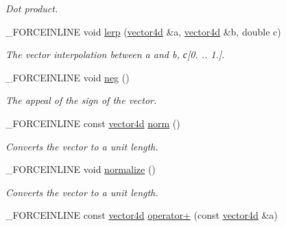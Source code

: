 \begin{DoxyCompactItemize}
\begin{DoxyCompactList}\small\item\em Dot product. \end{DoxyCompactList}\item 
\hypertarget{classbt_1_1vector4d_ab1e3ffe12c06bbbcbb81704040e593ce}{\-\_\-\-F\-O\-R\-C\-E\-I\-N\-L\-I\-N\-E void \hyperlink{classbt_1_1vector4d_ab1e3ffe12c06bbbcbb81704040e593ce}{lerp} (\hyperlink{classbt_1_1vector4d}{vector4d} \&a, \hyperlink{classbt_1_1vector4d}{vector4d} \&b, double c)}\label{classbt_1_1vector4d_ab1e3ffe12c06bbbcbb81704040e593ce}

\begin{DoxyCompactList}\small\item\em The vector interpolation between a and b, с\mbox{[}0. .. 1.\mbox{]}. \end{DoxyCompactList}\item 
\hypertarget{classbt_1_1vector4d_afda0bf083e9e2fd3bab3dcce3dc132b6}{\-\_\-\-F\-O\-R\-C\-E\-I\-N\-L\-I\-N\-E void \hyperlink{classbt_1_1vector4d_afda0bf083e9e2fd3bab3dcce3dc132b6}{neg} ()}\label{classbt_1_1vector4d_afda0bf083e9e2fd3bab3dcce3dc132b6}

\begin{DoxyCompactList}\small\item\em The appeal of the sign of the vector. \end{DoxyCompactList}\item 
\hypertarget{classbt_1_1vector4d_a971bfccfe2aa2b1665a5a978dadd31a6}{\-\_\-\-F\-O\-R\-C\-E\-I\-N\-L\-I\-N\-E const \hyperlink{classbt_1_1vector4d}{vector4d} \hyperlink{classbt_1_1vector4d_a971bfccfe2aa2b1665a5a978dadd31a6}{norm} ()}\label{classbt_1_1vector4d_a971bfccfe2aa2b1665a5a978dadd31a6}

\begin{DoxyCompactList}\small\item\em Converts the vector to a unit length. \end{DoxyCompactList}\item 
\hypertarget{classbt_1_1vector4d_ad9211980a8127159fc8bc90ea9cd1001}{\-\_\-\-F\-O\-R\-C\-E\-I\-N\-L\-I\-N\-E void \hyperlink{classbt_1_1vector4d_ad9211980a8127159fc8bc90ea9cd1001}{normalize} ()}\label{classbt_1_1vector4d_ad9211980a8127159fc8bc90ea9cd1001}

\begin{DoxyCompactList}\small\item\em Converts the vector to a unit length. \end{DoxyCompactList}\item 
\hypertarget{classbt_1_1vector4d_a7cbb6d40e46b3c01823539c2eb9cbf29}{\-\_\-\-F\-O\-R\-C\-E\-I\-N\-L\-I\-N\-E const \hyperlink{classbt_1_1vector4d}{vector4d} \hyperlink{classbt_1_1vector4d_a7cbb6d40e46b3c01823539c2eb9cbf29}{operator+} (const \hyperlink{classbt_1_1vector4d}{vector4d} \&a)}\label{classbt_1_1vector4d_a7cbb6d40e46b3c01823539c2eb9cbf29}


\end{DoxyCompactItemize}
